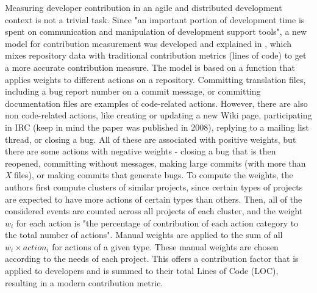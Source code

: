 

Measuring developer contribution in an agile and distributed development context is not a trivial task. Since "an important portion of development time is spent on communication and manipulation of development support tools", a new model for contribution measurement was developed and explained in \cite{Gousios_2008}, which mixes repository data with traditional contribution metrics (lines of code) to get a more accurate contribution measure. The model is based on a function that applies weights to different actions on a repository. Committing translation files, including a bug report number on a commit message, or committing documentation files are examples of code-related actions. However, there are also non code-related actions, like creating or updating a new Wiki page, participating in IRC (keep in mind the paper was published in 2008), replying to a mailing list thread, or closing a bug. All of these are associated with positive weights, but there are some actions with negative weights - closing a bug that is then reopened, committing without messages, making large commits (with more than \textit{X} files), or making commits that generate bugs. To compute the weights, the authors first compute clusters of similar projects, since certain types of projects are expected to have more actions of certain types than others. Then, all of the considered events are counted across all projects of each cluster, and the weight $w_i$ for each action is "the percentage of contribution of each action category to the total number of actions". Manual weights are applied to the sum of all $w_i \times action_i$ for actions of a given type. These manual weights are chosen according to the needs of each project. This offers a contribution factor that is applied to developers and is summed to their total Lines of Code (LOC), resulting in a modern contribution metric.

